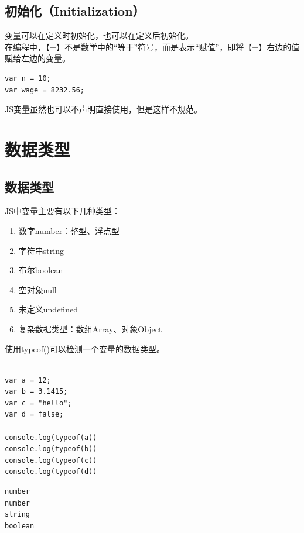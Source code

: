 \subsection{初始化（Initialization）}

变量可以在定义时初始化，也可以在定义后初始化。 \\

在编程中，【=】不是数学中的“等于”符号，而是表示“赋值”，即将【=】右边的值赋给左边的变量。 \\

\begin{lstlisting}[style=htmlcssjs]
var n = 10;
var wage = 8232.56;
\end{lstlisting}

JS变量虽然也可以不声明直接使用，但是这样不规范。

\newpage

\section{数据类型}

\subsection{数据类型}

JS中变量主要有以下几种类型：

\begin{enumerate}
	\item 数字number：整型、浮点型
	\item 字符串string
	\item 布尔boolean
	\item 空对象null
	\item 未定义undefined
	\item 复杂数据类型：数组Array、对象Object
\end{enumerate}

使用typeof()可以检测一个变量的数据类型。 \\

 \\

\begin{lstlisting}[style=htmlcssjs]
var a = 12;
var b = 3.1415;
var c = "hello";
var d = false;

console.log(typeof(a))
console.log(typeof(b))
console.log(typeof(c))
console.log(typeof(d))
\end{lstlisting}

\begin{tcolorbox}
	\begin{verbatim}
number
number
string
boolean
	\end{verbatim}
\end{tcolorbox}

